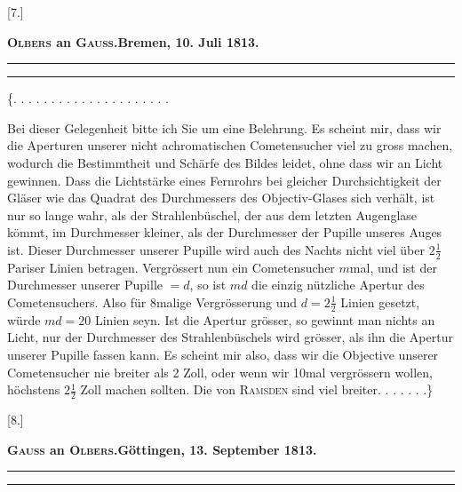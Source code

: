 \clearpage\begingroup
{}
\begin{center}
[7.]\par\medskip
\textbf{\textsc{Olbers} an \textsc{Gauss}.\quad Bremen, 10. Juli 1813.}\par\medskip
\rule{.80\linewidth}{.4pt}\par
[\textsc{Wilhelm Olbers}, Sein Leben und seine Werke II\,1, S. 524.]\par
\rule{.80\linewidth}{.4pt}
\end{center}
\noindent\{. . . . . . . . . . . . . . . . . . . . .\par
\noindent\hspace*{\parindent}Bei dieser Gelegenheit bitte ich Sie um eine Belehrung. Es scheint mir, dass wir die Aperturen unserer nicht achromatischen Cometensucher viel zu gross machen, wodurch die Bestimmtheit und Schärfe des Bildes leidet, ohne dass wir an Licht gewinnen. Dass die Lichtstärke eines Fernrohrs bei gleicher Durchsichtigkeit der Gläser wie das Quadrat des Durchmessers des Objectiv-Glases sich verhält, ist nur so lange wahr, als der Strahlenbüschel, der aus
\clearpage{}
\noindent dem letzten Augenglase kömmt, im Durchmesser kleiner, als der Durchmesser der Pupille unseres Auges ist. Dieser Durchmesser unserer Pupille wird auch des Nachts nicht viel über $2\frac12$ Pariser Linien betragen. Vergrössert nun ein Cometensucher $m$mal, und ist der Durchmesser unserer Pupille $=d$, so ist $md$ die einzig nützliche Apertur des Cometensuchers. Also für 8malige Vergrösserung und $d=2\frac12$ Linien gesetzt, würde $md=20$ Linien seyn. Ist die Apertur grösser, so gewinnt man nichts an Licht, nur der Durchmesser des Strahlenbüschels wird grösser, als ihn die Apertur unserer Pupille fassen kann. Es scheint mir also, dass wir die Objective unserer Cometensucher nie breiter als 2 Zoll, oder wenn wir 10mal vergrössern wollen, höchstens $2\frac12$ Zoll machen sollten. Die von \textsc{Ramsden} sind viel breiter. . . . . . .\}
\bigskip\begin{center}
[8.]\par\medskip
\textbf{\textsc{Gauss} an \textsc{Olbers}.\quad Göttingen, 13. September 1813.}\par\medskip
\rule{.80\linewidth}{.4pt}\par
[\textsc{Wilhelm Olbers}, Sein Leben und seine Werke II\,1, S. 530.]\par
\rule{.80\linewidth}{.4pt}
\end{center}
